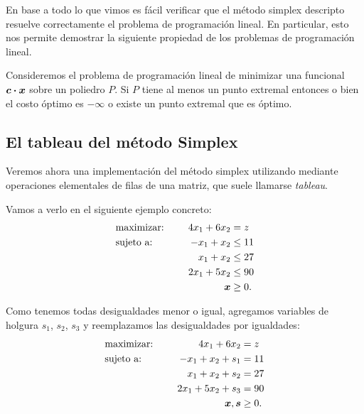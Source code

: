 En base a todo lo que vimos es fácil verificar que el método simplex descripto resuelve correctamente el problema de programación lineal.
En particular, esto nos permite demostrar la siguiente propiedad de los problemas de programación lineal.

\begin{theorem}
Consideremos el problema de programación lineal de minimizar una funcional $\bm{c} \boldsymbol{\cdot} \bm{x}$ sobre un poliedro $P$. Si $P$ tiene al menos un punto extremal entonces o bien el costo óptimo es $-\infty$ o existe un punto extremal que es óptimo.
\end{theorem}









\subsection{El tableau del método Simplex}

Veremos ahora una implementación del método simplex utilizando mediante operaciones elementales de filas de una matriz, que suele llamarse \emph{tableau}.

Vamos a verlo en el siguiente ejemplo concreto:
\begin{alignat*}{2}
   & \text{maximizar: } \quad &  4 x_1 + 6 x_2 &= z\\
   & \text{sujeto a: }  \quad & -x_1 + x_2 &\le 11 \\
   &   \quad & x_1 + x_2 &\le 27 \\
   &   \quad & 2x_1 + 5x_2 &\le 90 \\
   & &  \bm{x} &\ge 0.
\end{alignat*}

Como tenemos todas desigualdades menor o igual, agregamos variables de holgura $s_1$, $s_2$, $s_3$ y reemplazamos las desigualdades por igualdades:
\begin{alignat*}{2}
   & \text{maximizar: } \quad &  4 x_1 + 6 x_2 &= z\\
   & \text{sujeto a: }  \quad & -x_1 + x_2 +s_1&= 11 \\
   &   \quad & x_1 + x_2 +s_2&= 27 \\
   &   \quad & 2x_1 + 5x_2 +s_3&= 90 \\
   & &  \bm{x}, \bm{s} &\ge 0.
\end{alignat*}

